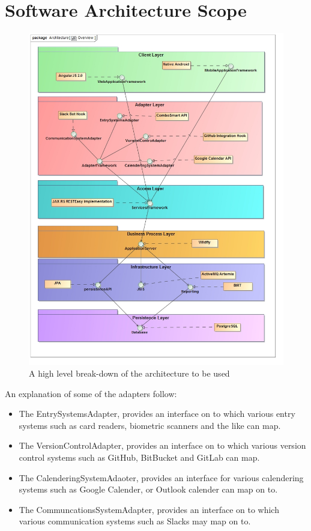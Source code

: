 \documentclass[11pt,a4paper]{article}
\begin{document}
\section{Software Architecture Scope}
\begin{figure}[H]
	\begin{center}
		\includegraphics[scale=0.4]{../Images/Architecture_Overview.jpg}
		\caption{A high level break-down of the architecture to be used}
	\end{center}
\end{figure}

\pagebreak

An explanation of some of the adapters follow:
\begin{itemize}
	\item The EntrySystemsAdapter, provides an interface on to which various entry systems such as card readers, biometric scanners and the like can map.
	\item The VersionControlAdapter, provides an interface on to which various version control systems such as GitHub, BitBucket and GitLab can map.
	\item The CalenderingSystemAdaoter, provides an interface for various calendering systems such as Google Calender, or Outlook calender can map on to.
	\item The CommuncationsSystemAdapter, provides an interface on to which various communication systems such as Slacks may map on to.\\\\
\end{itemize}
\end{document}

